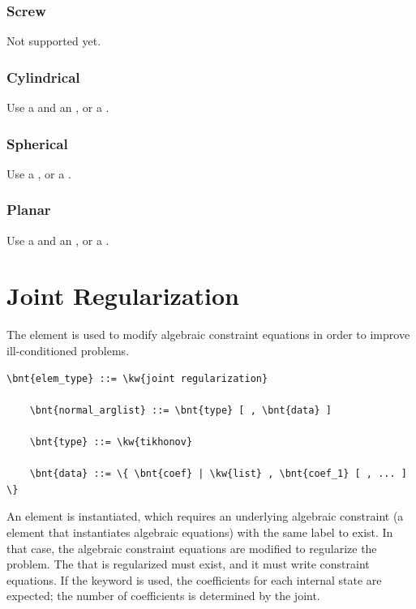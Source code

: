 \subsubsection{Screw}
Not supported yet.

\subsubsection{Cylindrical}
Use a  and an , or a .

\subsubsection{Spherical}
Use a , or a .

\subsubsection{Planar}
Use a  and an , or a .




\section{Joint Regularization}
The  element is used to modify
algebraic constraint equations in order to improve ill-conditioned
problems.

\begin{Verbatim}[commandchars=\\\{\}]
    \bnt{elem_type} ::= \kw{joint regularization}

    \bnt{normal_arglist} ::= \bnt{type} [ , \bnt{data} ]

    \bnt{type} ::= \kw{tikhonov}

    \bnt{data} ::= \{ \bnt{coef} | \kw{list} , \bnt{coef_1} [ , ... ] \}
\end{Verbatim}
An element is instantiated, which requires
an underlying algebraic constraint (a  element
that instantiates algebraic equations) with the same label to exist.
In that case, the algebraic constraint equations are modified
to regularize the problem.
The  that is regularized must exist,
and it must write constraint equations.
If the keyword  is used, the coefficients for each internal state
are expected; the number of coefficients is determined by the joint.

